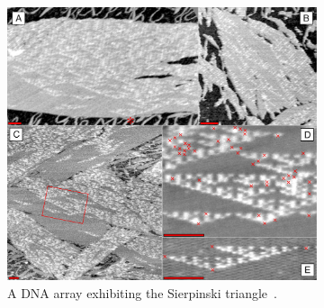 \begin{figure}
\begin{subfigure}{0.3\linewidth}
    \includegraphics[height=\myMinHeight]{img/Rothemund-DNA-SierpinskiGasket}
    \caption{A DNA array exhibiting the Sierpinski triangle~\cite{wikimediacommons2007dna}.}\label{fig:material_examples:sierpinski}
  \end{subfigure}%
  \caption{}\label{fig:material_examples}
\end{figure}%




